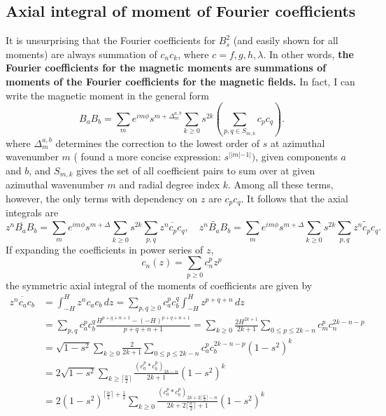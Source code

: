 \documentclass[a4paper, 11pt]{article}
\begin{document}
\subsection{Axial integral of moment of Fourier coefficients}

It is unsurprising that the Fourier coefficients for $B_s^2$ (and easily shown for all moments) are always summation of $c_n c_k$, where $c=f, g, h, \lambda$. In other words, \textbf{the Fourier coefficients for the magnetic moments are summations of moments of the Fourier coefficients for the magnetic fields.} In fact, I can write the magnetic moment in the general form
\[
    B_a B_b = \sum_m e^{im\phi} s^{m + \Delta_m^{a,b}} \sum_{k \geq 0} s^{2k} \left(\sum_{p,q\in S_{m,k}} c_p c_q\right).
\]
where $\Delta_m^{a,b}$ determines the correction to the lowest order of $s$ at azimuthal wavenumber $m$ (\textcite{holdenried-chernoff_long_2021} found a more concise expression: $s^{||m|-1|})$, given components $a$ and $b$, and $S_{m,k}$ gives the set of all coefficient pairs to sum over at given azimuthal wavenumber $m$ and radial degree index $k$. Among all these terms, however, the only terms with dependency on $z$ are $c_p c_q$. It follows that the axial integrals are
\[
    \overline{z^n B_a B_b} = \sum_m e^{im\phi} s^{m + \Delta} \sum_{k \geq 0} s^{2k} \sum_{p,q} \overline{z^n c_p c_q},\quad
    \widetilde{z^n B_a B_b} = \sum_m e^{im\phi} s^{m + \Delta} \sum_{k \geq 0} s^{2k} \sum_{p,q} \widetilde{z^n c_p c_q}.
\]
If expanding the coefficients in power series of $z$, 
\[
    c_n (z) = \sum_{p \geq 0} c_n^p z^p
\]
the symmetric axial integral of the moments of coefficients are given by
\begin{equation}
\begin{aligned}
    \overline{z^n c_a c_b} &= \int_{-H}^H z^n c_a c_b \, dz = \sum_{p, q \geq 0} c_a^p c_b^q \int_{-H}^H z^{p + q + n} \, dz \\
    &= \sum_{p,q} c_a^p c_b^q \frac{H^{p+q+n+1} - (-H)^{p+q+n+1}}{p + q + n + 1} 
    = \sum_{k\geq 0} \frac{2H^{2k+1}}{2k+1} \sum_{0\leq p \leq 2k-n} c_m^p c_n^{2k-n-p} \\ 
    &= \sqrt{1-s^2} \sum_{k\geq 0} \frac{2}{2k+1} \sum_{0\leq p \leq 2k-n} c_a^p c_b^{2k-n-p} \left(1-s^2\right)^k \\
    &= 2 \sqrt{1-s^2} \sum_{k\geq \lceil \frac{n}{2} \rceil} \frac{\left(c_a^{p} * c_b^p\right)_{2k-n}}{2k+1} \left(1 - s^2\right)^k \\ 
    &= 2 \left(1 - s^2\right)^{\lceil \frac{n}{2} \rceil + \frac{1}{2}} \sum_{k\geq 0} \frac{\left(c_a^{p} * c_b^p\right)_{2k+2\lceil \frac{n}{2} \rceil-n}}{2k+2\lceil\frac{n}{2}\rceil + 1} \left(1 - s^2\right)^k
\end{aligned}
\end{equation}
\end{document}
